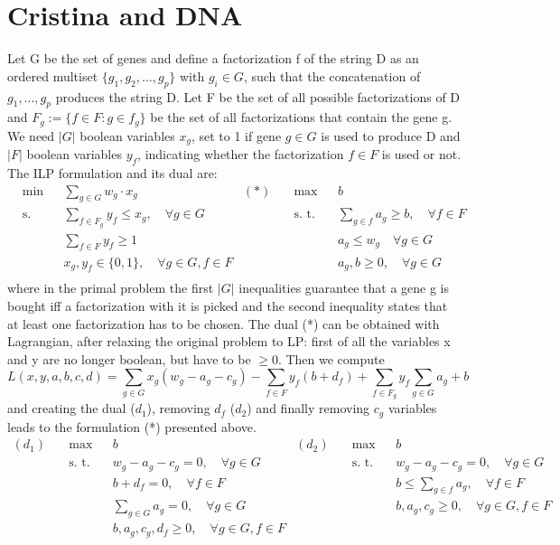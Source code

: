 \section{Cristina and DNA}
Let G be the set of genes and define a factorization f of the string D as an ordered multiset $\{g_1, g_2, ..., g_p\}$ with $g_i \in G$, such that the concatenation of $g_1, ..., g_p$ produces the string D. Let F be the set of all possible factorizations of D and $F_g:= \{f \in F : g \in f_g\}$ be the set of all factorizations that contain the gene g. We need $|G|$ boolean variables $x_g$, set to 1 if gene $g \in G$ is used to produce D and $|F|$ boolean variables $y_f$, indicating whether the factorization $f \in F$ is used or not. The ILP formulation and its dual are:
\begin{align*}
&\text{min} && \sum_{g \in G} w_g \cdot x_g & (*) \quad & \text{max}&& b  \\
&\text{s. t.} && \sum_{f \in F_g} y_f \leq x_g, \quad \forall g \in G &&\text{s. t.} && \sum_{g \in f} a_g \geq b, \quad \forall f \in F \\
&&& \sum_{f \in F} y_f \geq 1 &&&&  a_g \leq w_g \quad \forall g \in G\\
&&& x_g,y_f \in \{0,1\}, \quad \forall g \in G, f \in F &&&& a_g,b \geq 0, \quad \forall g \in G\\
\end{align*}
where in the primal problem the first $|G|$ inequalities guarantee that a gene g is bought iff a factorization with it is picked and the second inequality states that at least one factorization has to be chosen. The dual (*) can be obtained with Lagrangian, after relaxing the original problem to LP: first of all the variables x and y are no longer boolean, but have to be $\geq 0$. Then we compute
\[
L(x,y,a,b,c,d) = \sum_{g \in G} x_g (w_g - a_g - c_g) - \sum_{f \in F} y_f (b + d_f) + \sum_{f \in F_g} y_f\sum_{g \in G} a_g + b
\]
and creating the dual ($d_1$), removing $d_f$ ($d_2$) and finally removing $c_g$ variables leads to the formulation (*) presented above.
\begin{align*}
(d_1) \quad&\text{max} && b & (d_2)\quad& \text{max}&& b  \\
&\text{s. t.} && w_g -a_g-c_g = 0, \quad \forall g \in G &&\text{s. t.} && w_g - a_g -c_g = 0, \quad \forall g \in G \\
&&& b +d_f = 0, \quad \forall f \in F &&&&  b \leq \sum_{g \in f} a_g, \quad \forall f \in F\\
&&&\sum_{g \in G} a_g = 0, \quad \forall g \in G &&&& b,a_g,c_g \geq 0, \quad \forall g \in G, f \in F\\
&&& b,a_g,c_g,d_f \geq 0, \quad \forall g \in G, f \in F  &&&&\\
\end{align*}



